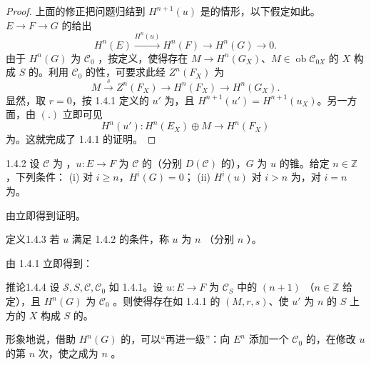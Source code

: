 \begin{proof}
上面的修正把问题归结到 $H^{n+1}(u)$ 是的情形，以下假定如此。$E\to F\to G$ 的给出
\[H^n(E)\xrightarrow{H^n(u)}H^n(F)\longrightarrow H^n(G)\longrightarrow0.\tag{.}\]
由于 $H^n(G)$ 为 $\mathscr C_0$ ，按定义，使得存在 $M\to H^n(G_X)$、$M\in\operatorname{ob}\mathscr C_{0X}$ 的 $X$ 构成 $S$ 的。利用 $\mathscr C_0$ 的性，可要求此经 $Z^n(F_X)$ 为
\[M\xrightarrow s Z^n(F_X)\longrightarrow H^n(F_X)\longrightarrow H^n(G_X).\]
显然，取 $r=0$，按 1.4.1 定义的 $u'$ 为，且 $H^{n+1}(u')=H^{n+1}(u_X)$。另一方面，由 $(.)$ 立即可见
\[H^n(u'):H^n(E_X)\oplus M\longrightarrow H^n(F_X)\]
为。这就完成了 1.4.1 的证明。
\end{proof}
\begin{SGAresult}{}{1.4.2}
设 $\mathscr C$ 为 ，$u:E\to F$ 为 $\mathscr C$ 的（分别 $D(\mathscr C)$ 的），$G$ 为 $u$ 的锥。给定 $n\in\mathbb Z$，下列条件：
(i) 对 $i\geq n$，$H^i(G)=0$；
(ii) $H^i(u)$ 对 $i>n$ 为，对 $i=n$ 为。
\end{SGAresult}
由立即得到证明。
\begin{SGAresult}{定义}{1.4.3}
若 $u$ 满足 1.4.2 的条件，称 $u$ 为 $n$ （分别 $n$ ）。
\end{SGAresult}
由 1.4.1 立即得到：
\begin{SGAresult}{推论}{1.4.4}
设 $\mathscr S,S,\mathscr C,\mathscr C_0$ 如 1.4.1。设 $u:E\to F$ 为 $\mathscr C_S$ 中的 $(n+1)$ （$n\in\mathbb Z$ 给定），且 $H^n(G)$ 为 $\mathscr C_0$ 。则使得存在如 1.4.1 的 $(M,r,s)$、使 $u'$ 为 $n$ 的 $S$ 上方的 $X$ 构成 $S$ 的。
\end{SGAresult}
形象地说，借助 $H^n(G)$ 的，可以“再进一级”：向 $E^n$ 添加一个 $\mathscr C_0$ 的，在修改 $u$ 的第 $n$ 次，使之成为 $n$ 。
